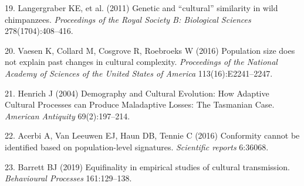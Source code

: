 \documentclass[9pt,twocolumn,twoside,]{pnas-new}
\begin{document}
\hypertarget{ref-langergraber_genetic_2011}{}
19. Langergraber KE, et al. (2011) Genetic and ``cultural'' similarity
in wild chimpanzees. \emph{Proceedings of the Royal Society B:
Biological Sciences} 278(1704):408--416.

\hypertarget{ref-vaesen_population_2016}{}
20. Vaesen K, Collard M, Cosgrove R, Roebroeks W (2016) Population size
does not explain past changes in cultural complexity. \emph{Proceedings
of the National Academy of Sciences of the United States of America}
113(16):E2241--2247.

\hypertarget{ref-henrich_demography_2004}{}
21. Henrich J (2004) Demography and Cultural Evolution: How Adaptive
Cultural Processes can Produce Maladaptive Losses: The Tasmanian Case.
\emph{American Antiquity} 69(2):197--214.

\hypertarget{ref-acerbi_conformity_2016}{}
22. Acerbi A, Van Leeuwen EJ, Haun DB, Tennie C (2016) Conformity cannot
be identified based on population-level signatures. \emph{Scientific
reports} 6:36068.

\hypertarget{ref-barrett_equifinality_2019}{}
23. Barrett BJ (2019) Equifinality in empirical studies of cultural
transmission. \emph{Behavioural Processes} 161:129--138.



% 
\end{document}
